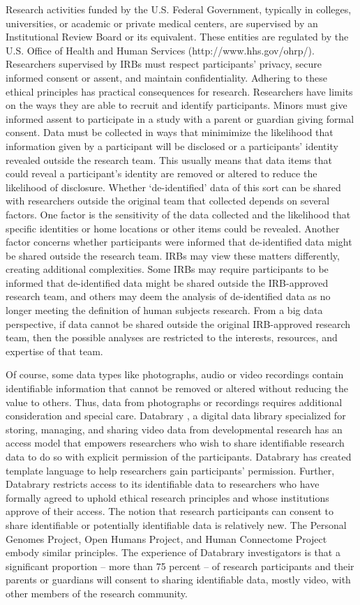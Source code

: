 \documentclass[letterpaper,man,apacite]{apa6}
\begin{document}
Research activities funded by the U.S. Federal Government, typically in colleges, universities, or academic or private medical centers, are supervised by an Institutional Review Board or its equivalent.
These entities are regulated by the U.S. Office of Health and Human Services (http://www.hhs.gov/ohrp/).
Researchers supervised by IRBs must respect participants' privacy, secure informed consent or assent, and maintain confidentiality. 
Adhering to these ethical principles has practical consequences for research.
Researchers have limits on the ways they are able to recruit and identify participants.
Minors must give informed assent to participate in a study with a parent or guardian giving formal consent.
Data must be collected in ways that minimimize the likelihood that information given by a participant will be disclosed or a participants' identity revealed outside the research team.
This usually means that data items that could reveal a participant's identity are removed or altered to reduce the likelihood of disclosure.
Whether `de-identified' data of this sort can be shared with researchers outside the original team that collected depends on several factors.
One factor is the sensitivity of the data collected and the likelihood that specific identities or home locations or other items could be revealed.
Another factor concerns whether participants were informed that de-identified data might be shared outside the research team.
IRBs may view these matters differently, creating additional complexities.
Some IRBs may require participants to be informed that de-identified data might be shared outside the IRB-approved research team, and others may deem the analysis of de-identified data as no longer meeting the definition of human subjects research.
From a big data perspective, if data cannot be shared outside the original IRB-approved research team, then the possible analyses are restricted to the interests, resources, and expertise of that team.

Of course, some data types like photographs, audio or video recordings contain identifiable information that cannot be removed or altered without reducing the value to others.
Thus, data from photographs or recordings requires additional consideration and special care.
Databrary \cite{databrary.org}, a digital data library specialized for storing, managing, and sharing video data from developmental research has an access model that empowers researchers who wish to share identifiable research data to do so with explicit permission of the participants.
Databrary has created template language to help researchers gain participants' permission.
Further, Databrary restricts access to its identifiable data to researchers who have formally agreed to uphold ethical research principles and whose institutions approve of their access.
The notion that research participants can consent to share identifiable or potentially identifiable data is relatively new.
The Personal Genomes Project, Open Humans Project, and Human Connectome Project embody similar principles.
The experience of Databrary investigators is that a significant proportion -- more than 75 percent -- of research participants and their parents or guardians will consent to sharing identifiable data, mostly video, with other members of the research community.
\end{document}
